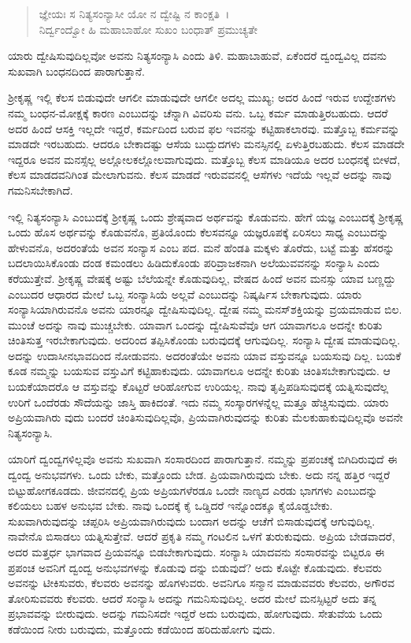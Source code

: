 \begin{verse}
ಜ್ಞೇಯಃ ಸ ನಿತ್ಯಸಂನ್ಯಾಸೀ ಯೋ ನ ದ್ವೇಷ್ಟಿ ನ ಕಾಂಕ್ಷತಿ~।\\ನಿರ್ದ್ವಂದ್ವೋ ಹಿ ಮಹಾಬಾಹೋ ಸುಖಂ ಬಂಧಾತ್ ಪ್ರಮುಚ್ಯತೇ 
\end{verse}

{\small ಯಾರು ದ್ವೇಷಿಸುವುದಿಲ್ಲವೋ ಅವನು ನಿತ್ಯಸಂನ್ಯಾಸಿ ಎಂದು ತಿಳಿ. ಮಹಾಬಾಹುವೆ, ಏಕೆಂದರೆ ದ್ವಂದ್ವವಿಲ್ಲ ದವನು ಸುಖವಾಗಿ ಬಂಧನದಿಂದ ಪಾರಾಗುತ್ತಾನೆ.}

ಶ‍್ರೀಕೃಷ್ಣ ಇಲ್ಲಿ ಕೆಲಸ ಬಿಡುವುದೇ ಆಗಲೀ ಮಾಡುವುದೇ ಆಗಲೀ ಅದಲ್ಲ ಮುಖ್ಯ; ಅದರ ಹಿಂದೆ ಇರುವ ಉದ್ದೇಶಗಳು ನಮ್ಮ ಬಂಧನ-ಮೋಕ್ಷಕ್ಕೆ ಕಾರಣ ಎಂಬುದನ್ನು ಚೆನ್ನಾಗಿ ವಿವರಿಸು ವನು. ಒಬ್ಬ ಕರ್ಮ ಮಾಡುತ್ತಿರಬಹುದು. ಆದರೆ ಅದರ ಹಿಂದೆ ಆಸಕ್ತಿ ಇಲ್ಲದೇ ಇದ್ದರೆ, ಕರ್ಮದಿಂದ ಬರುವ ಫಲ ಇವನನ್ನು ಕಟ್ಟಿಹಾಕಲಾರವು. ಮತ್ತೊಬ್ಬ ಕರ್ಮವನ್ನು ಮಾಡದೇ ಇರಬಹುದು. ಆದರೂ ಬೇಕಾದಷ್ಟು ಆಸೆಯ ಬುದ್ಬುದಗಳು ಮನಸ್ಸಿನಲ್ಲಿ ಏಳುತ್ತಿರಬಹುದು. ಕೆಲಸ ಮಾಡದೇ ಇದ್ದರೂ ಅವನ ಮನಸ್ಸೆಲ್ಲ ಅಲ್ಲೋಲಕಲ್ಲೋಲವಾಗುವುದು. ಮತ್ತೊಬ್ಬ ಕೆಲಸ ಮಾಡಿಯೂ ಅದರ ಬಂಧನಕ್ಕೆ ಬೀಳದೆ, ಕೆಲಸ ಮಾಡದವನಿಗಿಂತ ಮೇಲಾಗುವನು. ಕೆಲಸ ಮಾಡದೆ ಇರುವವನಲ್ಲಿ ಆಸೆಗಳು ಇದೆಯೆ ಇಲ್ಲವೆ ಅದನ್ನು ನಾವು ಗಮನಿಸಬೇಕಾಗಿದೆ.

ಇಲ್ಲಿ ನಿತ್ಯಸಂನ್ಯಾಸಿ ಎಂಬುದಕ್ಕೆ ಶ‍್ರೀಕೃಷ್ಣ ಒಂದು ಶ್ರೇಷ್ಠವಾದ ಅರ್ಥವನ್ನು ಕೊಡುವನು. ಹೇಗೆ ಯಜ್ಞ ಎಂಬುದಕ್ಕೆ ಶ‍್ರೀಕೃಷ್ಣ ಒಂದು ಹೊಸ ಅರ್ಥವನ್ನು ಕೊಡುವನೊ, ಪ್ರತಿಯೊಂದು ಕೆಲಸವನ್ನೂ ಯಜ್ಞರೂಪಕ್ಕೆ ಏರಿಸಲು ಸಾಧ್ಯ ಎಂಬುದನ್ನು ಹೇಳುವನೊ, ಅದರಂತೆಯೆ ಅವನ ಸಂನ್ಯಾಸ ಎಂಬ ಪದ. ಮನೆ ಹೆಂಡತಿ ಮಕ್ಕಳು ತೊರೆದು, ಬಟ್ಟೆ ಮತ್ತು ಹೆಸರನ್ನು ಬದಲಾಯಿಸಿಕೊಂಡು ದಂಡ ಕಮಂಡಲು ಹಿಡಿದುಕೊಂಡು ಪರಿವ್ರಾಜಕನಾಗಿ ಅಲೆಯುವವನನ್ನು ಸಂನ್ಯಾಸಿ ಎಂದು ಕರೆಯುತ್ತೇವೆ. ಶ‍್ರೀಕೃಷ್ಣ ವೇಷಕ್ಕೆ ಅಷ್ಟು ಬೆಲೆಯನ್ನೇ ಕೊಡುವುದಿಲ್ಲ, ವೇಷದ ಹಿಂದೆ ಅವನ ಮನಸ್ಸು ಯಾವ ಬಣ್ಣದ್ದು ಎಂಬುದರ ಆಧಾರದ ಮೇಲೆ ಒಬ್ಬ ಸಂನ್ಯಾಸಿಯೆ ಅಲ್ಲವೆ ಎಂಬುದನ್ನು ನಿಷ್ಕರ್ಷಿಸ ಬೇಕಾಗುವುದು. ಯಾರು ಸಂನ್ಯಾಸಿಯಾಗಿರುವನೊ ಅವನು ಯಾರನ್ನೂ ದ್ವೇಷಿಸುವುದಿಲ್ಲ. ದ್ವೇಷ ನಮ್ಮ ಮನಸ್​ಶಕ್ತಿಯನ್ನು ವ್ರಯಮಾಡುವ ಬಿಲ. ಮುಂಚೆ ಅದನ್ನು ನಾವು ಮುಚ್ಚಬೇಕು. ಯಾವಾಗ ಒಂದನ್ನು ದ್ವೇಷಿಸುವೆವೊ ಆಗ ಯಾವಾಗಲೂ ಅದನ್ನೇ ಕುರಿತು ಚಿಂತಿಸುತ್ತ ಇರಬೇಕಾಗುವುದು. ಅದರಿಂದ ತಪ್ಪಿಸಿಕೊಂಡು ಬರುವುದಕ್ಕೆ ಆಗುವುದಿಲ್ಲ. ಸಂನ್ಯಾಸಿ ದ್ವೇಷ ಮಾಡುವುದಿಲ್ಲ. ಅದನ್ನು ಉದಾಸೀನಭಾವದಿಂದ ನೋಡುವನು. ಅದರಂತೆಯೇ ಅವನು ಯಾವ ವಸ್ತುವನ್ನೂ ಬಯಸುವು ದಿಲ್ಲ. ಬಯಕೆ ಕೂಡ ನಮ್ಮನ್ನು ಬಯಸುವ ವಸ್ತುವಿಗೆ ಕಟ್ಟಿಹಾಕುವುದು. ಯಾವಾಗಲೂ ಅದನ್ನೇ ಕುರಿತು ಚಿಂತಿಸಬೇಕಾಗುವುದು. ಆ ಬಯಕೆಯಾದರೊ ಆ ವಸ್ತುವನ್ನು ಕೊಟ್ಟರೆ ಆರಿಹೋಗುವ ಉರಿಯಲ್ಲ. ನಾವು ತೃಪ್ತಿಪಡಿಸುವುದಕ್ಕೆ ಯತ್ನಿಸುವುದೆಲ್ಲ ಉರಿಗೆ ಒಂದೆರಡು ಸೌದೆಯನ್ನು ಜಾಸ್ತಿ ಹಾಕಿದಂತೆ. ಇದು ನಮ್ಮ ಸಂಸ್ಕಾರಗಳನ್ನೆಲ್ಲ ಮತ್ತೂ ಹೆಚ್ಚಿಸುವುದು. ಯಾರು ಅಪ್ರಿಯವಾಗಿರು ವುದು ಬಂದರೆ ಚಿಂತಿಸುವುದಿಲ್ಲವೊ, ಪ್ರಿಯವಾಗಿರುವುದನ್ನು ಕುರಿತು ಮೆಲಕುಹಾಕುವುದಿಲ್ಲವೊ ಅವನೇ ನಿತ್ಯಸಂನ್ಯಾಸಿ.

ಯಾರಿಗೆ ದ್ವಂದ್ವಗಳಿಲ್ಲವೊ ಅವನು ಸುಖವಾಗಿ ಸಂಸಾರದಿಂದ ಪಾರಾಗುತ್ತಾನೆ. ನಮ್ಮನ್ನು ಪ್ರಪಂಚಕ್ಕೆ ಬಿಗಿದಿರುವುದೆ ಈ ದ್ವಂದ್ವ ಅನುಭವಗಳು. ಒಂದು ಬೇಕು, ಮತ್ತೊಂದು ಬೇಡ. ಪ್ರಿಯವಾಗಿರುವುದು ಬೇಕು. ಅದು ನನ್ನ ಹತ್ತಿರ ಇದ್ದರೆ ಬಿಟ್ಟುಹೋಗಕೂಡದು. ಜೀವನದಲ್ಲಿ ಪ್ರಿಯ ಅಪ್ರಿಯಗಳೆರಡೂ ಒಂದೇ ನಾಣ್ಯದ ಎರಡು ಭಾಗಗಳು ಎಂಬುದನ್ನು ಕಲಿಯಲು ಬಹಳ ಅನುಭವ ಬೇಕು. ನಾವು ಒಂದಕ್ಕೆ ಕೈ ಒಡ್ಡಿದರೆ ಇನ್ನೊಂದಕ್ಕೂ ಕೈಯೊಡ್ಡಬೇಕು. ಸುಖವಾಗಿರುವುದನ್ನು ಚಪ್ಪರಿಸಿ ಅಪ್ರಿಯವಾಗಿರುವುದು ಬಂದಾಗ ಅದನ್ನು ಆಚೆಗೆ ಬಿಸಾಡುವುದಕ್ಕೆ ಆಗುವುದಿಲ್ಲ. ನಾವೇನೊ ಬಿಸಾಡಲು ಯತ್ನಿಸುತ್ತೇವೆ. ಆದರೆ ಪ್ರಕೃತಿ ನಮ್ಮ ಗಂಟಲಿನ ಒಳಗೆ ತುರುಕುವುದು. ಅಪ್ರಿಯ ಬೇಡವಾದರೆ, ಅದರ ಮತ್ತರ್ಧ ಭಾಗವಾದ ಪ್ರಿಯವನ್ನೂ ಬಿಡಬೇಕಾಗುವುದು. ಸಂನ್ಯಾಸಿ ಯಾದವನು ಸಂಸಾರವನ್ನು ಬಿಟ್ಟರೂ ಈ ಪ್ರಪಂಚ ಅವನಿಗೆ ದ್ವಂದ್ವ ಅನುಭವಗಳನ್ನು ಕೊಡುವು ದನ್ನು ಬಿಡುವುದೆ? ಅದು ಕೊಟ್ಟೇ ಕೊಡುವುದು. ಕೆಲವರು ಅವನನ್ನು ಟೀಕಿಸುವರು, ಕೆಲವರು ಅವನನ್ನು ಹೊಗಳುವರು. ಅವನಿಗೂ ಸನ್ಮಾನ ಮಾಡುವವರು ಕೆಲವರು, ಅಗೌರವ ತೋರಿಸುವವರು ಕೆಲವರು. ಆದರೆ ಸಂನ್ಯಾಸಿ ಅದನ್ನು ಗಮನಿಸುವುದಿಲ್ಲ. ಅದರ ಮೇಲೆ ಮನಸ್ಸಿಟ್ಟರೆ ಅದು ತನ್ನ ಪ್ರಭಾವವನ್ನು ಬೀರುವುದು. ಅದನ್ನು ಗಮನಿಸದೇ ಇದ್ದರೆ ಅದು ಬರುವುದು, ಹೋಗುವುದು. ಸೇತುವೆಯ ಒಂದು ಕಡೆಯಿಂದ ನೀರು ಬರುವುದು, ಮತ್ತೊಂದು ಕಡೆಯಿಂದ ಹರಿದುಹೋಗು ವುದು.

